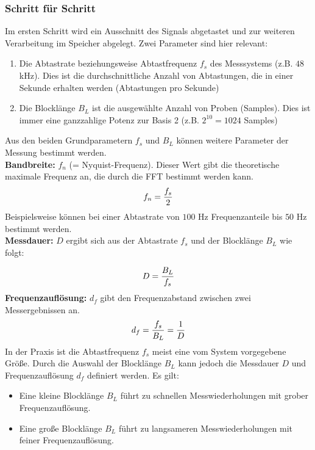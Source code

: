 \subsubsection{Schritt für Schritt}
Im ersten Schritt wird ein Ausschnitt des Signals abgetastet und zur weiteren Verarbeitung im Speicher abgelegt. Zwei Parameter sind hier relevant:
\begin{enumerate}
	\item Die Abtastrate beziehungsweise Abtastfrequenz $f_s$ des Messsystems (z.B. $48$ kHz). Dies ist die durchschnittliche Anzahl von Abtastungen, die in einer Sekunde erhalten werden (Abtastungen pro Sekunde)
	\item Die Blocklänge $B_L$ ist die ausgewählte Anzahl von Proben (Samples). Dies ist immer eine ganzzahlige Potenz zur Basis 2 (z.B. $2^{10}=1024$ Samples)
\end{enumerate}
Aus den beiden Grundparametern $f_s$ und $B_L$ können weitere Parameter der Messung bestimmt werden. \\
\textbf{Bandbreite:}  $f_n$ (= Nyquist-Frequenz). Dieser Wert gibt die theoretische maximale Frequenz an, die durch die FFT bestimmt werden kann.
\begin{align}
	\centering
	f_n = \frac{f_s}{2}
	\label{gl:Nyquist-Frequenz}
\end{align}
Beispielsweise können bei einer Abtastrate von $100$ Hz Frequenzanteile bis $50$ Hz bestimmt werden.\\
\textbf{Messdauer:} $D$ ergibt sich aus der Abtastrate $f_s$ und der Blocklänge $B_L$ wie folgt:

\begin{align}
	\centering
	D = \frac{B_L}{f_s}
	\label{gl:Messdauer}
\end{align}
\textbf{Frequenzauflösung:} $d_f$ gibt den Frequenzabstand zwischen zwei Messergebnissen an.
\begin{align}
	\centering
	d_f = \frac{f_s}{B_L} = \frac{1}{D}
	\label{gl:Frequenzaufloesung}
\end{align}
In der Praxis ist die Abtastfrequenz $f_s$ meist eine vom System vorgegebene Größe. Durch die Auswahl der Blocklänge $B_L$ kann jedoch die Messdauer $D$ und Frequenzauflösung $d_f$ definiert werden. Es gilt:\\
\begin{itemize}
	\item Eine kleine Blocklänge $B_L$ führt zu schnellen Messwiederholungen mit grober Frequenzauflösung.
	\item Eine große Blocklänge $B_L$ führt zu langsameren Messwiederholungen mit feiner Frequenzauflösung.
\end{itemize}
